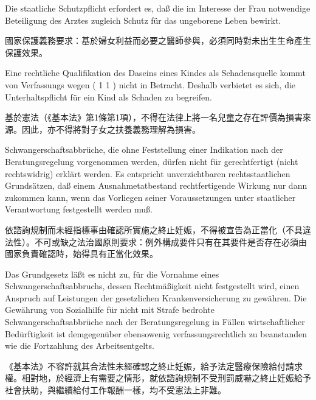\documentclass[12pt]{article}
\begin{document}
\syncleft
\begin{sourcepara}[title={原文要旨 13}]
Die staatliche Schutzpflicht erfordert es, daß die im Interesse der Frau notwendige Beteiligung des Arztes zugleich Schutz für das ungeborene Leben bewirkt.
\end{sourcepara}
\begin{transpara}
國家保護義務要求：基於婦女利益而必要之醫師參與，必須同時對未出生生命產生保護效果。
\end{transpara}

\syncleft
\begin{sourcepara}[title={原文要旨 14}]
Eine rechtliche Qualifikation des Daseins eines Kindes als Schadensquelle kommt von Verfassungs wegen (\abbrArt{} 1 \abbrAbs{} 1 \abbrGG{}\ggfnArtOneOneDE{}) nicht in Betracht. Deshalb verbietet es sich, die Unterhaltspflicht für ein Kind als Schaden zu begreifen.
\end{sourcepara}
\begin{transpara}
基於憲法（《基本法》第1條第1項\ggfnArtOneOneZH{}），不得在法律上將一名兒童之存在評價為損害來源。因此，亦不得將對子女之扶養義務理解為損害。
\end{transpara}

\syncleft
\begin{sourcepara}[title={原文要旨 15}]
Schwangerschaftsabbrüche, die ohne Feststellung einer Indikation nach der Beratungsregelung vorgenommen werden, dürfen nicht für gerechtfertigt (nicht rechtswidrig) erklärt werden. Es entspricht unverzichtbaren rechtsstaatlichen Grundsätzen, daß einem Ausnahmetatbestand rechtfertigende Wirkung nur dann zukommen kann, wenn das Vorliegen seiner Voraussetzungen unter staatlicher Verantwortung festgestellt werden muß.
\end{sourcepara}
\begin{transpara}
依諮詢規制而未經指標事由確認所實施之終止妊娠，不得被宣告為正當化（不具違法性）。不可或缺之法治國原則要求：例外構成要件只有在其要件是否存在必須由國家負責確認時，始得具有正當化效果。
\end{transpara}

\syncleft
\begin{sourcepara}[title={原文要旨 16}]
Das Grundgesetz läßt es nicht zu, für die Vornahme eines Schwangerschaftsabbruchs, dessen Rechtmäßigkeit nicht festgestellt wird, einen Anspruch auf Leistungen der gesetzlichen Krankenversicherung zu gewähren. Die Gewährung von Sozialhilfe für nicht mit Strafe bedrohte Schwangerschaftsabbrüche nach der Beratungsregelung in Fällen wirtschaftlicher Bedürftigkeit ist demgegenüber ebensowenig verfassungsrechtlich zu beanstanden wie die Fortzahlung des Arbeitsentgelts.
\end{sourcepara}
\begin{transpara}
《基本法》不容許就其合法性未經確認之終止妊娠，給予法定醫療保險給付請求權。相對地，於經濟上有需要之情形，就依諮詢規制不受刑罰威嚇之終止妊娠給予社會扶助，與繼續給付工作報酬一樣，均不受憲法上非難。
\end{transpara}
\end{document}
